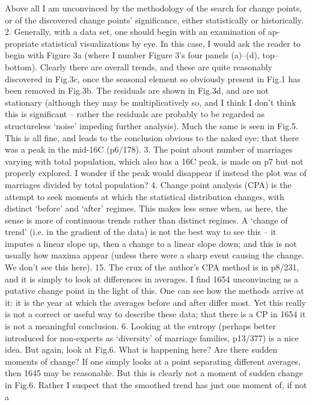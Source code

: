 \documentclass[11pt]{article}
\newcounter{reviewer}
\newcounter{point}[reviewer]
\begin{document}
Above all I am unconvinced by the methodology of the search for change
points, or of the discovered change points’ significance, either statistically
or historically.
2. Generally, with a data set, one should begin with an examination of ap-
propriate statistical visualizations by eye. In this case, I would ask the reader
to begin with Figure 3a (where I number Figure 3’s four panels (a)–(d), top–
bottom). Clearly there are overall trends, and these are quite reasonably
discovered in Fig.3c, once the seasonal element so obviously present in Fig.1
has been removed in Fig.3b. The residuals are shown in Fig.3d, and are not
stationary (although they may be multiplicatively so, and I think I don’t
think this is significant – rather the residuals are probably to be regarded
as structureless ‘noise’ impeding further analysis). Much the same is seen
in Fig.5. This is all fine, and leads to the conclusion obvious to the naked
eye: that there was a peak in the mid-16C (p6/178).
3. The point about number of marriages varying with total population,
which also has a 16C peak, is made on p7 but not properly explored. I
wonder if the peak would disappear if instead the plot was of marriages
divided by total population?
4. Change point analysis (CPA) is the attempt to seek moments at which
the statistical distribution changes, with distinct ‘before’ and ‘after’ regimes.
This makes less sense when, as here, the sense is more of continuous trends
rather than distinct regimes. A ‘change of trend’ (i.e. in the gradient of the
data) is not the best way to see this – it imputes a linear slope up, then a
change to a linear slope down; and this is not usually how maxima appear
(unless there were a sharp event causing the change. We don’t see this here).
15. The crux of the author’s CPA method is in p8/231, and it is simply
to look at differences in averages. I find 1654 unconvincing as a putative
change point in the light of this. One can see how the methods arrive at it:
it is the year at which the averages before and after differ most. Yet this
really is not a correct or useful way to describe these data; that there is a
CP in 1654 it is not a meaningful conclusion.
6. Looking at the entropy (perhaps better introduced for non-experts as
‘diversity’ of marriage families, p13/377) is a nice idea. But again, look at
Fig.6. What is happening here? Are there sudden moments of change? If
one simply looks at a point separating different averages, then 1645 may
be reasonable. But this is clearly not a moment of sudden change in Fig.6.
Rather I suspect that the smoothed trend has just one moment of, if not a
\end{document}
